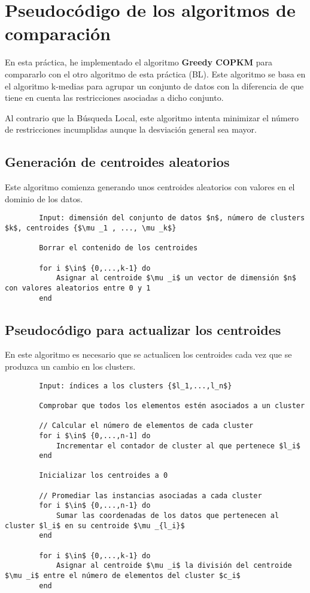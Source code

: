 \section{Pseudocódigo de los algoritmos de comparación}
		En esta práctica, he implementado el algoritmo \textbf{Greedy COPKM} para compararlo con el otro algoritmo de esta práctica (BL).
		Este algoritmo se basa en el algoritmo k-medias para agrupar un conjunto de datos con la diferencia de que tiene en cuenta 
		las restricciones asociadas a dicho conjunto.

		Al contrario que la Búsqueda Local, este algoritmo intenta minimizar el número de restricciones incumplidas aunque la desviación general 
		sea mayor.

		\subsection{Generación de centroides aleatorios}
		Este algoritmo comienza generando unos centroides aleatorios con valores en el dominio de los datos.

		\begin{lstlisting}
		Input: dimensión del conjunto de datos $n$, número de clusters $k$, centroides {$\mu _1 , ..., \mu _k$}
		
		Borrar el contenido de los centroides

		for i $\in$ {0,...,k-1} do 
			Asignar al centroide $\mu _i$ un vector de dimensión $n$ con valores aleatorios entre 0 y 1
		end
		\end{lstlisting}

		\subsection{Pseudocódigo para actualizar los centroides}
		En este algoritmo es necesario que se actualicen los centroides cada vez que se produzca un cambio en los clusters.

		\begin{lstlisting}
		Input: índices a los clusters {$l_1,...,l_n$}

		Comprobar que todos los elementos estén asociados a un cluster

		// Calcular el número de elementos de cada cluster
		for i $\in$ {0,...,n-1] do 
			Incrementar el contador de cluster al que pertenece $l_i$
		end 

		Inicializar los centroides a 0

		// Promediar las instancias asociadas a cada cluster
		for i $\in$ {0,...,n-1} do
			Sumar las coordenadas de los datos que pertenecen al cluster $l_i$ en su centroide $\mu _{l_i}$
		end
		
		for i $\in$ {0,...,k-1} do
			Asignar al centroide $\mu _i$ la división del centroide $\mu _i$ entre el número de elementos del cluster $c_i$
		end
		\end{lstlisting}

